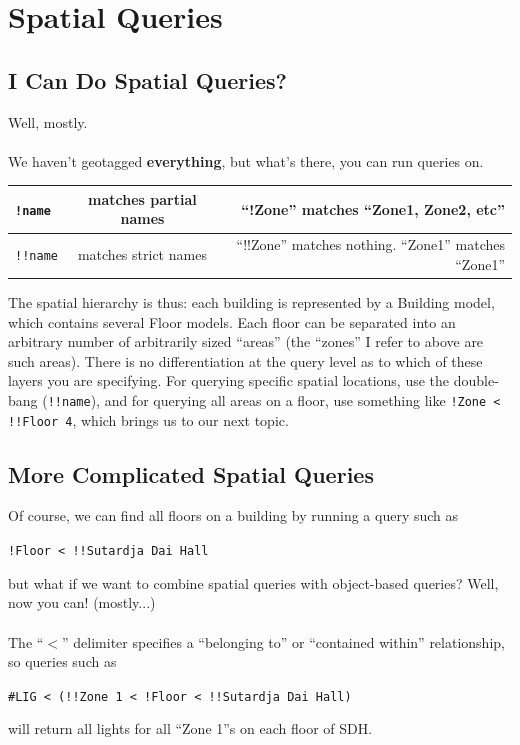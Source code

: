 \documentclass{article}
\begin{document}
\section{Spatial Queries} %
\label{sec:spatial_queries}
\subsection{I Can Do Spatial Queries?} %
\label{sub:i_can_do_spatial_queries_}
Well, mostly. 
\\\\
We haven't geotagged {\bf everything}, but what's there, you can run queries on. 
\begin{center}
\begin{tabular}{|l|c|r|}
 \hline
\verb+!name+ & matches partial names & ``!Zone'' matches ``Zone1, Zone2, etc'' \\ \hline
\verb+!!name+ & matches strict names & ``!!Zone'' matches nothing. ``Zone1'' matches ``Zone1'' \\ \hline
\end{tabular}
\end{center}
The spatial hierarchy is thus: each building is represented by a Building model, which contains several Floor models. Each floor can be separated into an arbitrary number of arbitrarily sized ``areas'' (the ``zones'' I refer to above are such areas). There is no differentiation at the query level as to which of these layers you are specifying. For querying specific spatial locations, use the double-bang (\verb+!!name+), and for querying all areas on a floor, use something like \verb+!Zone < !!Floor 4+, which brings us to our next topic.
\subsection{More Complicated Spatial Queries} %
\label{sec:more_complicated_spatial_queries}
Of course, we can find all floors on a building by running a query such as
\begin{center}
\verb+!Floor < !!Sutardja Dai Hall+
\end{center}but what if we want to combine spatial queries with object-based queries? Well, now you can! (mostly...)
\\\\
The ``$<$'' delimiter specifies a ``belonging to'' or ``contained within'' relationship, so queries such as
\begin{center}
\verb+#LIG < (!!Zone 1 < !Floor < !!Sutardja Dai Hall)+
\end{center}
will return all lights for all ``Zone 1''s on each floor of SDH.
\end{document}
